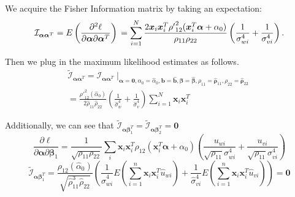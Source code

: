 \documentclass[aap,authoryear, preprint]{imsart}
\numberwithin{equation}{section}
\theoremstyle{plain}
\begin{document}
We acquire the Fisher Information matrix by taking an expectation:
\begin{equation}
    \mathcal{I}_{\bm{\alpha}\bm{\alpha}^T} = E\left(\frac{\partial^2 \ell}{\partial \bm{\alpha} \partial \bm{\alpha}^T}\right)\\
    = \sum_{i=1}^{N} \frac{2\bm{x}_i \bm{x}_i^T {\rho '}^2_{12}(\bm{x}_i^T\bm{\alpha}+\alpha_0)}{\rho_{11}\rho_{22}} \left(
    \frac{1}{\sigma_{wi}^4} + \frac{1}{\sigma_{vi}^4}
    \right).
\end{equation}

\noindent Then we plug in the maximum likelihood estimates as follows.
\begin{equation}
\begin{multlined}
        \tilde{\mathcal{I}}_{\bm{\alpha}\bm{\alpha}^T} = \mathcal{I}_{\bm{\alpha}\bm{\alpha}^T}\mid_{
        \bm{\alpha}=\bm{0}, 
        \alpha_0 = \hat{\alpha}_0,
        \bm{b} = \bm{\hat{b}},
        \bm{\beta} = \bm{\hat{\beta}},
        {\rho}_{11} = \bm{\hat{\rho}}_{11},
        {\rho}_{22} = \bm{\hat{\rho}}_{22}}\\
        = \frac{{\rho '}^2_{12}({\hat{\alpha}_0})}{2\hat{\rho}_{11}\hat{\rho}_{22}} \left(\frac{1}{\hat{\sigma}_{w}^4} + \frac{1}{\hat{\sigma}_{v}^4} \right) \sum_{i=1}^{N} \bm{x}_i \bm{x}_i^T
    \end{multlined}
\end{equation}

\noindent Additionally, we can see that $\tilde{\mathcal{I}}_{\bm{\alpha}{\bm{\beta}_1^T}} =  \tilde{\mathcal{I}}_{\bm{\alpha}{\bm{\beta}_2^T}} = \bm{0}$
\begin{equation}
\frac{\partial \ell}{\partial \bm{\alpha} \partial\bm{\beta}_1}= 
    \frac{1}{\sqrt{\rho_{11}\rho_{22}}} \sum_i \bm{x}_i \bm{x}_i^T \rho_{12}(\bm{x}_i^T\bm{\alpha} + \alpha_0) \left( 
    \frac{u_{wi}}{\sqrt{\rho_{11}}\sigma_{wi}^4} + \frac{u_{vi}}{\sqrt{\rho_{11}}\sigma_{vi}^4}
    \right)
\end{equation}
$$
\tilde{\mathcal{I}}_{\bm{\alpha}{\bm{\beta}_1^T}} = 
\frac{\rho_{12}(\hat{\alpha}_0)}{\sqrt{\hat{\rho}_{11}^3\hat{\rho}_{22}}} \left(
\frac{1}{\hat{\sigma}_{wi}^4}
E\left( \sum_{i=1}^{n} \bm{x}_i \bm{x}_i^T \hat{u}_{wi}\right)
+\frac{1}{\hat{\sigma}_{vi}^4}
E\left( \sum_{i=1}^{n} \bm{x}_i \bm{x}_i^T \hat{u}_{vi} \right)
\right) = \bm{0}$$
\end{document}
